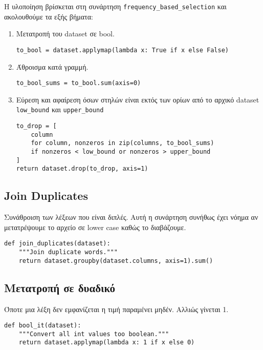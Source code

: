 Η υλοποίηση βρίσκεται στη συνάρτηση \lstinline!frequency_based_selection! και ακολουθούμε τα εξής βήματα:
\begin{enumerate}
\item Μετατροπή του dataset σε bool.
\begin{lstlisting}[numbers=none, aboveskip=\smallskipamount, belowskip=\smallskipamount, captionpos=none]
to_bool = dataset.applymap(lambda x: True if x else False)
\end{lstlisting}

\item Άθροισμα κατά γραμμή.
\begin{lstlisting}[numbers=none, aboveskip=\smallskipamount, belowskip=\smallskipamount, captionpos=none]
to_bool_sums = to_bool.sum(axis=0)
\end{lstlisting}

\item Εύρεση και αφαίρεση όσων στηλών είναι εκτός των ορίων από το αρχικό dataset \lstinline!low_bound! και \lstinline!upper_bound!
\begin{lstlisting}[numbers=none, aboveskip=\smallskipamount, belowskip=\smallskipamount, captionpos=none]
to_drop = [
    column
    for column, nonzeros in zip(columns, to_bool_sums)
    if nonzeros < low_bound or nonzeros > upper_bound
]
return dataset.drop(to_drop, axis=1)
\end{lstlisting}
\end{enumerate}

\subsection{Join Duplicates}
Συνάθροιση των λέξεων που είναι διπλές.
Αυτή η συνάρτηση συνήθως έχει νόημα αν μετατρέψουμε το αρχείο σε lower case καθώς το διαβάζουμε.
\begin{lstlisting}[captionpos=none, numbers=none]
def join_duplicates(dataset):
    """Join duplicate words."""
    return dataset.groupby(dataset.columns, axis=1).sum()
\end{lstlisting}

\subsection{Μετατροπή σε δυαδικό}
Όποτε μια λέξη δεν εμφανίζεται η τιμή παραμένει μηδέν.
Αλλιώς γίνεται 1.
\begin{lstlisting}[captionpos=none, numbers=none]
def bool_it(dataset):
    """Convert all int values too boolean."""
    return dataset.applymap(lambda x: 1 if x else 0)
\end{lstlisting}

